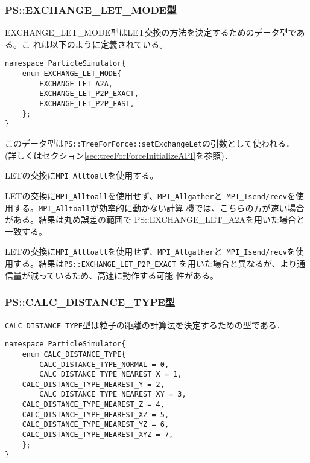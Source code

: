 \subsubsection{PS::EXCHANGE\_LET\_MODE型}
\label{sec:datatype_enum_exchange_let_mode}


EXCHANGE\_LET\_MODE型はLET交換の方法を決定するためのデータ型である。こ
れは以下のように定義されている。

\begin{lstlisting}[caption=boundarycondition]
namespace ParticleSimulator{
    enum EXCHANGE_LET_MODE{
        EXCHANGE_LET_A2A,
        EXCHANGE_LET_P2P_EXACT,
        EXCHANGE_LET_P2P_FAST,
    };
}
\end{lstlisting}

このデータ型は{\tt PS::TreeForForce::setExchangeLet}の引数として使われる．
(詳しくはセクション\ref{sec:treeForForceInitializeAPI}を参照)．


LETの交換に{\tt MPI\_Alltoall}を使用する。


LETの交換に{\tt MPI\_Alltoall}を使用せず、{\tt MPI\_Allgather}と{\tt
MPI\_Isend/recv}を使用する。{\tt MPI\_Alltoall}が効率的に動かない計算
機では、こちらの方が速い場合がある。結果は丸め誤差の範囲で
PS::EXCHANGE\_LET\_A2Aを用いた場合と一致する。


LETの交換に{\tt MPI\_Alltoall}を使用せず、{\tt MPI\_Allgather}と{\tt
MPI\_Isend/recv}を使用する。結果は{\tt PS::EXCHANGE\_LET\_P2P\_EXACT}
を用いた場合と異なるが、より通信量が減っているため、高速に動作する可能
性がある。



\subsubsection{PS::CALC\_DISTANCE\_TYPE型}
\label{sec:datatype_enum_calc_distance_type}


{\tt CALC\_DISTANCE\_TYPE}型は粒子の距離の計算法を決定するための型である．

\begin{lstlisting}[caption=boundarycondition]
namespace ParticleSimulator{
    enum CALC_DISTANCE_TYPE{
        CALC_DISTANCE_TYPE_NORMAL = 0,
        CALC_DISTANCE_TYPE_NEAREST_X = 1,
	CALC_DISTANCE_TYPE_NEAREST_Y = 2,
        CALC_DISTANCE_TYPE_NEAREST_XY = 3,
	CALC_DISTANCE_TYPE_NEAREST_Z = 4,
	CALC_DISTANCE_TYPE_NEAREST_XZ = 5,
	CALC_DISTANCE_TYPE_NEAREST_YZ = 6,
	CALC_DISTANCE_TYPE_NEAREST_XYZ = 7,
    };
}
\end{lstlisting}


